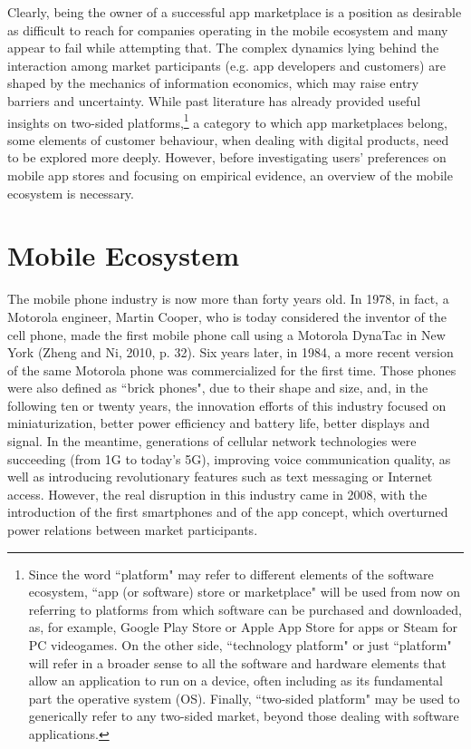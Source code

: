 Clearly, being the owner of a successful app marketplace is a position as desirable as difficult to reach for companies operating in the mobile ecosystem and many appear to fail while attempting that. The complex dynamics lying behind the interaction among market participants (e.g. app developers and customers) are shaped by the mechanics of information economics, which may raise entry barriers and uncertainty. While past literature has already provided useful insights on two-sided platforms,\footnote{Since the word ``platform" may refer to different elements of the software ecosystem, ``app (or software) store or marketplace" will be used from now on referring to platforms from which software can be purchased and downloaded, as, for example, Google Play Store or Apple App Store for apps or Steam for PC videogames. On the other side, ``technology platform" or just ``platform" will refer in a broader sense to all the software and hardware elements that allow an application to run on a device, often including as its fundamental part the operative system (OS). Finally, ``two-sided platform" may be used to generically refer to any two-sided market, beyond those dealing with software applications.} a category to which app marketplaces belong, some elements of customer behaviour, when dealing with digital products, need to be explored more deeply. However, before investigating users' preferences on mobile app stores and focusing on empirical evidence, an overview of the mobile ecosystem is necessary.


\section{Mobile Ecosystem}

The mobile phone industry is now more than forty years old. In 1978, in fact, a Motorola engineer, Martin Cooper, who is today considered the inventor of the cell phone, made the first mobile phone call using a Motorola DynaTac in New York (Zheng and Ni, 2010, p. 32). Six years later, in 1984, a more recent version of the same Motorola phone was commercialized for the first time. Those phones were also defined as ``brick phones", due to their shape and size, and, in the following ten or twenty years, the innovation efforts of this industry focused on miniaturization, better power efficiency and battery life, better displays and signal. In the meantime, generations of cellular network technologies were succeeding (from 1G to today's 5G), improving voice communication quality, as well as introducing revolutionary features such as text messaging or Internet access. However, the real disruption in this industry came in 2008, with the introduction of the first smartphones and of the app concept, which overturned power relations between market participants. 

